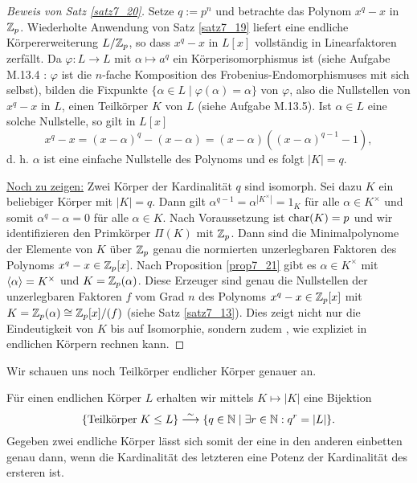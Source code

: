 \begin{proof}[Beweis von Satz \ref{satz7_20}]
	Setze $q := p^n$ und betrachte das Polynom $x^q - x$ in $\mathbb{Z}_p$. Wiederholte Anwendung von Satz \ref{satz7_19} liefert eine endliche Körpererweiterung $L/\mathbb{Z}_p$, so dass $x^q - x$ in $L[x]$ vollständig in Linearfaktoren zerfällt. Da $\varphi \colon L\to L$ mit $\alpha \mapsto a^q$ ein Körperisomorphismus ist (siehe Aufgabe M.13.4 : $\varphi$ ist die $n$-fache Komposition des Frobenius-Endomorphismuses mit sich selbst), bilden die Fixpunkte $\{\alpha \in L \mid \varphi(\alpha) = \alpha\}$ von $\varphi$, also die Nullstellen von $x^q - x$ in $L$, einen Teilkörper $K$ von $L$ (siehe Aufgabe M.13.5). Ist $\alpha \in L$ eine solche Nullstelle, so gilt in $L[x]$
	\[x^q - x = (x-\alpha)^q - (x-\alpha) = (x-\alpha)((x-\alpha)^{q-1} - 1),\]
	d. h. $\alpha$ ist eine einfache Nullstelle des Polynoms und es folgt $|K| = q$.
	
	\underline{Noch zu zeigen:} Zwei Körper der Kardinalität $q$ sind isomorph. Sei dazu $K$ ein beliebiger Körper mit $|K| = q$. Dann gilt $\alpha^{q-1} = \alpha^{|K^\times|} = 1_K$ für alle $\alpha \in K^\times$ und somit $\alpha^q - \alpha = 0$ für alle $\alpha \in K$. Nach Voraussetzung ist $\mathrm{char}(K) = p$ und wir identifizieren den Primkörper $\Pi(K)$ mit $\mathbb{Z}_p$. Dann sind die Minimalpolynome der Elemente von $K$ über $\mathbb{Z}_p$ genau die normierten unzerlegbaren Faktoren des Polynoms $x^q - x \in \mathbb{Z}_p[x]$. Nach Proposition \ref{prop7_21} gibt es $\alpha \in K^\times$ mit $\langle \alpha \rangle = K^\times$ und $K = \mathbb{Z}_p(\alpha)$. Diese Erzeuger sind genau die Nullstellen der unzerlegbaren Faktoren $f$ vom Grad $n$ des Polynoms $x^q - x \in \mathbb{Z}_p[x]$ mit $K = \mathbb{Z}_p(\alpha) \cong \mathbb{Z}_p[x] / (f)$ (siehe Satz \ref{satz7_13}). Dies zeigt nicht nur die Eindeutigkeit von $K$ bis auf Isomorphie, sondern zudem , wie expliziet in endlichen Körpern rechnen kann.
\end{proof}
Wir schauen uns noch Teilkörper endlicher Körper genauer an.
\begin{satz}\label{satz7_22}
	Für einen endlichen Körper $L$ erhalten wir mittels $K \mapsto |K|$ eine Bijektion
	\[\{\text{Teilkörper}\;K \leq L\} \overset{\sim}{\longrightarrow} \{q \in \mathbb{N} \mid \exists r \in \mathbb{N} : q^r = |L|\}.\]
	Gegeben zwei endliche Körper lässt sich somit der eine in den anderen einbetten genau dann, wenn die Kardinalität des letzteren eine Potenz der Kardinalität des ersteren ist.
\end{satz}
